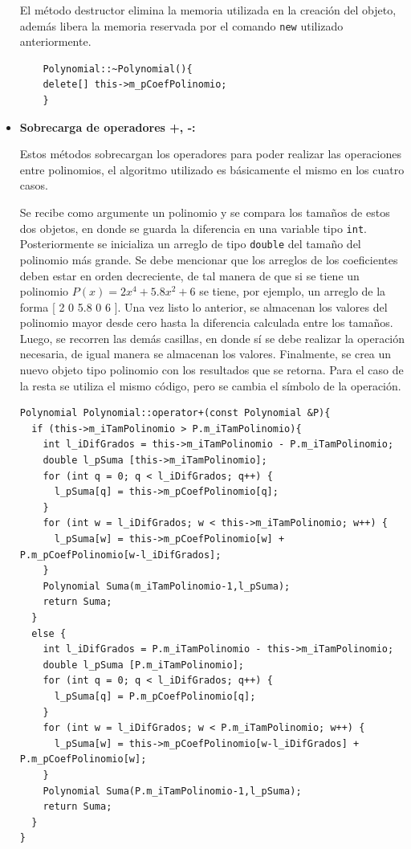 \begin{itemize}
    El método destructor elimina la memoria utilizada en la creación del objeto, además libera la memoria reservada por el comando \texttt{new} utilizado anteriormente.
    
    \begin{verbatim}
    Polynomial::~Polynomial(){
    delete[] this->m_pCoefPolinomio;
    }
    \end{verbatim}
    
    \item \textbf{Sobrecarga de operadores +, -:}
    
    Estos métodos sobrecargan los operadores para poder realizar las operaciones entre polinomios, el algoritmo utilizado es básicamente el mismo en los cuatro casos.
    
    Se recibe como argumente un polinomio y se compara los tamaños de estos dos objetos, en donde se guarda la diferencia en una variable tipo \texttt{int}. Posteriormente se inicializa un arreglo de tipo \texttt{double} del tamaño del polinomio más grande. Se debe mencionar que los arreglos de los coeficientes deben estar en orden decreciente, de tal manera de que si se tiene un polinomio $P(x)=2x^4+5.8x^2+6$ se tiene, por ejemplo, un arreglo de la forma [ 2  0  5.8  0  6 ]. Una vez listo lo anterior, se almacenan los valores del polinomio mayor desde cero hasta la diferencia calculada entre los tamaños. Luego, se recorren las demás casillas, en donde sí se debe realizar la operación necesaria, de igual manera se almacenan los valores. Finalmente, se crea un nuevo objeto tipo polinomio con los resultados que se retorna. Para el caso de la resta se utiliza el mismo código, pero se cambia el símbolo de la operación.
    
    \begin{verbatim}
Polynomial Polynomial::operator+(const Polynomial &P){
  if (this->m_iTamPolinomio > P.m_iTamPolinomio){
    int l_iDifGrados = this->m_iTamPolinomio - P.m_iTamPolinomio;
    double l_pSuma [this->m_iTamPolinomio];
    for (int q = 0; q < l_iDifGrados; q++) {
      l_pSuma[q] = this->m_pCoefPolinomio[q];
    }
    for (int w = l_iDifGrados; w < this->m_iTamPolinomio; w++) {
      l_pSuma[w] = this->m_pCoefPolinomio[w] + P.m_pCoefPolinomio[w-l_iDifGrados];
    }
    Polynomial Suma(m_iTamPolinomio-1,l_pSuma);
    return Suma;
  }
  else {
    int l_iDifGrados = P.m_iTamPolinomio - this->m_iTamPolinomio;
    double l_pSuma [P.m_iTamPolinomio];
    for (int q = 0; q < l_iDifGrados; q++) {
      l_pSuma[q] = P.m_pCoefPolinomio[q];
    }
    for (int w = l_iDifGrados; w < P.m_iTamPolinomio; w++) {
      l_pSuma[w] = this->m_pCoefPolinomio[w-l_iDifGrados] + P.m_pCoefPolinomio[w];
    }
    Polynomial Suma(P.m_iTamPolinomio-1,l_pSuma);
    return Suma;
  }
}
    \end{verbatim}
    

\end{itemize}
